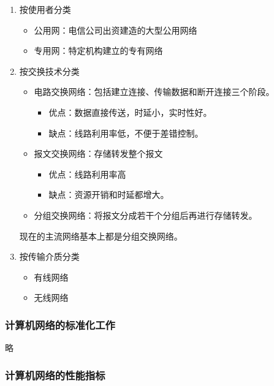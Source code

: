 \documentclass[12pt, a4paper, oneside]{ctexart}
\begin{document}
\begin{enumerate}
\begin{figure}
    \end{figure}
    \item 按使用者分类
    \begin{itemize}
        \item 公用网：电信公司出资建造的大型公用网络
        \item 专用网：特定机构建立的专有网络
    \end{itemize}
    \item 按交换技术分类
    \begin{itemize}
        \item 电路交换网络：包括建立连接、传输数据和断开连接三个阶段。
        \begin{itemize}
            \item 优点：数据直接传送，时延小，实时性好。
            \item 缺点：线路利用率低，不便于差错控制。
        \end{itemize}
        \item 报文交换网络：存储转发整个报文
        \begin{itemize}
            \item 优点：线路利用率高
            \item 缺点：资源开销和时延都增大。
        \end{itemize}
        \item 分组交换网络：将报文分成若干个分组后再进行存储转发。
    \end{itemize}
    现在的主流网络基本上都是分组交换网络。
    \item 按传输介质分类
    \begin{itemize}
        \item 有线网络
        \item 无线网络
    \end{itemize}
\end{enumerate}

\subsubsection{计算机网络的标准化工作}

略

\subsubsection{计算机网络的性能指标}
\label{performance_index}
\end{document}
